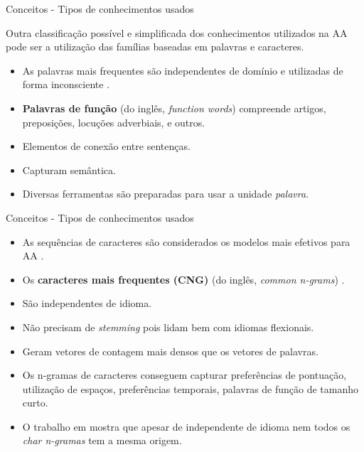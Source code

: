 \begin{frame}{Conceitos - Tipos de conhecimentos usados}

Outra classificação possível e simplificada dos conhecimentos utilizados na AA pode ser a utilização das famílias baseadas em palavras e caracteres.


\begin{tcolorbox}[colback=blue!1!white,colframe=blue!35!black,title=Palavras,valign=center]
	\begin{itemize}
		\item As palavras mais frequentes são independentes de domínio e utilizadas de forma inconsciente \cite{Kestemont2014}.
		\item {\bf Palavras de função} (do inglês, {\it function words}) compreende artigos, preposições, locuções adverbiais, e outros.\\
		\item Elementos de conexão entre sentenças.
		\item Capturam semântica. 
		\item Diversas ferramentas são preparadas para usar a unidade {\it palavra}.
	\end{itemize}			
\end{tcolorbox}

\end{frame}

\begin{frame}{Conceitos - Tipos de conhecimentos usados}\selectFont

	\begin{tcolorbox}[colback=green!1!white,colframe=green!35!black,title=Caracteres,valign=center]
		\begin{itemize}
			\item As sequências de caracteres são considerados os modelos mais efetivos para AA \cite{KjellWF94,Neal2017}.
			\item Os {\bf caracteres mais frequentes (CNG)} (do inglês, {\it common n-grams}) \cite{Keselj2003,Sapkota2014}.
			\item São independentes de idioma.
			\item Não precisam de {\it stemming} pois lidam bem com idiomas flexionais.
			\item Geram vetores de contagem mais densos que os vetores de palavras.
			\item Os n-gramas de caracteres conseguem capturar preferências de pontuação, utilização de espaços, preferências temporais, palavras de função de tamanho curto.
			\item O trabalho em  mostra que apesar de independente de idioma nem todos os {\it char n-gramas} tem a mesma origem.
		\end{itemize}

	\end{tcolorbox}
\end{frame}

